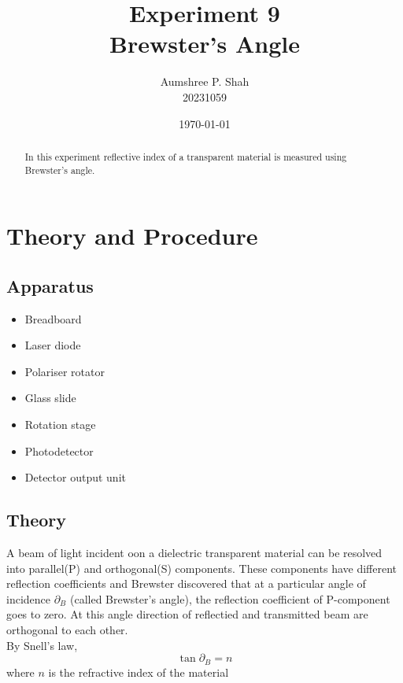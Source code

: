 \documentclass[%
 jor,
 amsmath,amssymb,
 reprint,
]{revtex4-2}
\begin{document}
\title{Experiment 9\\Brewster's Angle}

\author{Aumshree P. Shah\\20231059}
\date{\today}

\begin{abstract}
\centering
In this experiment reflective index of a transparent material is measured using Brewster's angle.
\end{abstract}

\maketitle
\section{Theory and Procedure}
\subsection{Apparatus}
\small
\begin{itemize}
	\item Breadboard\item Laser diode\item Polariser rotator\item Glass slide
\item Rotation stage\item Photodetector\item Detector output unit
\end{itemize}

\subsection{Theory}
A beam of light incident oon a dielectric transparent material can be resolved into parallel(P) and orthogonal(S) components. These components have different reflection coefficients and Brewster discovered that at a particular angle of incidence $\partial_B$ (called Brewster's angle), the reflection coefficient of P-component goes to zero. At this angle direction of reflectied and transmitted beam are orthogonal to each other. \\

By Snell's law, \begin{equation} \tan \partial_B = n
\end{equation}
where $n$ is the refractive index of the material
\end{document}
